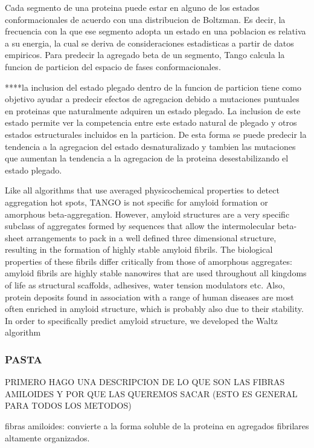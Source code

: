 Cada segmento de una proteina puede estar en alguno de los estados conformacionales de acuerdo con una distribucion de Boltzman. Es decir, la frecuencia con la que ese segmento adopta un estado en una poblacion es relativa a su energia, la cual se deriva de consideraciones estadisticas a partir de datos empiricos.  
Para predecir la agregado beta de un segmento, Tango calcula la funcion de particion del espacio de fases conformacionales.


****la inclusion del estado plegado dentro de la funcion de particion tiene como objetivo ayudar a predecir efectos de agregacion debido a mutaciones puntuales en proteinas que naturalmente adquiren un estado plegado. La inclusion de este estado permite ver la competencia entre este estado natural de plegado y otros estados estructurales incluidos en la particion. De esta forma se puede predecir la tendencia a la agregacion del estado desnaturalizado y tambien las mutaciones que aumentan la tendencia a la agregacion de la proteina desestabilizando el estado plegado.


Like all algorithms that use averaged physicochemical properties to detect aggregation hot spots, TANGO is not specific for amyloid formation or amorphous beta-aggregation. However, amyloid structures are a very specific subclass of aggregates formed by sequences that allow the intermolecular beta-sheet arrangements to pack in a well defined three dimensional structure, resulting in the formation of highly stable amyloid fibrils. The biological properties of these fibrils differ critically from those of amorphous aggregates: amyloid fibrils are highly stable nanowires that are used throughout all kingdoms of life as structural scaffolds, adhesives, water tension modulators etc. Also, protein deposits found in association with a range of human diseases are most often enriched in amyloid structure, which is probably also due to their stability. In order to specifically predict amyloid structure, we developed the Waltz algorithm





\subsubsection{PASTA}
PRIMERO HAGO UNA DESCRIPCION DE LO QUE SON LAS FIBRAS AMILOIDES Y POR QUE LAS QUEREMOS SACAR (ESTO ES GENERAL PARA TODOS LOS METODOS)

fibras amiloides: convierte a la forma soluble de la proteina en agregados fibrilares altamente organizados.

